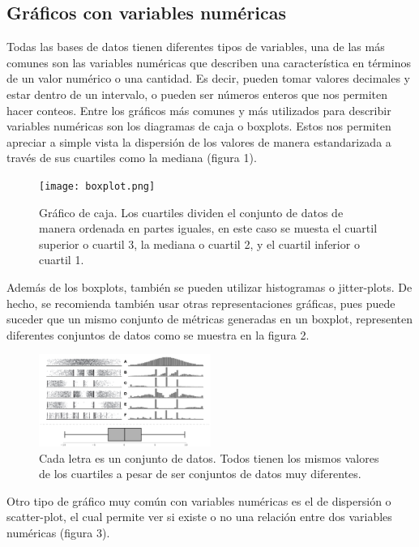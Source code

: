 \documentclass[conference, a4paper]{IEEEtran_ID}
\begin{document}
\subsection{Gráficos con variables numéricas}

Todas las bases de datos tienen diferentes tipos de variables, una de las más comunes son las variables numéricas que describen una característica en términos de un valor numérico o una cantidad. Es decir, pueden tomar valores decimales y estar dentro de un intervalo, o pueden ser números enteros que nos permiten hacer conteos. Entre los gráficos más comunes y más utilizados para describir variables numéricas son los diagramas de caja o boxplots. Estos nos permiten apreciar a simple vista la dispersión de los valores de manera estandarizada a través de sus cuartiles como la mediana (figura 1). 

\begin{figure}[htbp]
	\centerline{\texttt{[image: boxplot.png]}}
	\caption{Gráfico de caja. Los cuartiles dividen el conjunto de datos de manera ordenada en partes iguales, en este caso se muesta el cuartil superior o cuartil 3, la mediana o cuartil 2, y el cuartil inferior o cuartil 1.}
	\label{fig_sample}
\end{figure}

Además de los boxplots, también se pueden utilizar histogramas o jitter-plots. De hecho, se recomienda también usar otras representaciones gráficas, pues puede suceder que un mismo conjunto de métricas generadas en un boxplot, representen diferentes conjuntos de datos como se muestra en la figura 2. 

\begin{figure}[htbp]
	\centerline{\includegraphics[width=0.5\textwidth]{histograms.png}}
	\caption{Cada letra es un conjunto de datos. Todos tienen los mismos valores de los cuartiles a pesar de ser conjuntos de datos muy diferentes.}
	\label{fig_sample}
\end{figure}

Otro tipo de gráfico muy común con variables numéricas es el de dispersión o scatter-plot, el cual permite ver si existe o no una relación entre dos variables numéricas (figura 3). 
\end{document}
